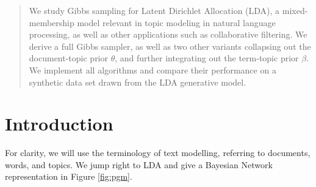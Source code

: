 \documentclass[a0,portrait]{a0poster}
\begin{document}

\begin{multicols}{2} %




\begin{abstract}

\large{
We study Gibbs sampling for Latent Dirichlet Allocation (LDA), a mixed-membership model relevant in topic modeling in natural language processing, as well as other applications such as collaborative filtering. We derive a full Gibbs sampler, as well as two other variants collapsing out the document-topic prior $\theta$, and further integrating out the term-topic prior $\beta$. We implement all algorithms and compare their performance on a synthetic data set drawn from the LDA generative model. 
}

\end{abstract}


\section*{Introduction}

\large{
For clarity, we will use the terminology of text modelling, referring to documents, words, and topics. We jump right to LDA and give a Bayesian Network representation in Figure \ref{fig:pgm}.

}



\end{multicols}
\end{document}

